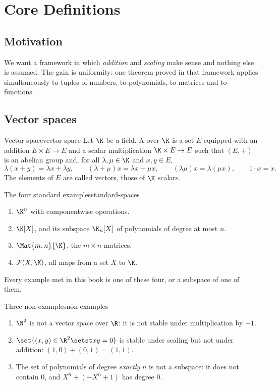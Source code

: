 \chapter{Core Definitions}
\label{ch:definitions}

\section{Motivation}

We want a framework in which \emph{addition} and \emph{scaling} make sense and
nothing else is assumed. The gain is uniformity: one theorem proved in that
framework applies simultaneously to tuples of numbers, to polynomials, to
matrices and to functions.

\section{Vector spaces}

\begin{definition}{Vector space}{vector-space}
Let $\K$ be a field. A  over $\K$ is a set $E$ equipped with
an addition $E\times E\to E$ and a scalar multiplication $\K\times E\to E$ such
that $(E,+)$ is an abelian group and, for all $\lambda,\mu\in\K$ and
$x,y\in E$,
\[
  \lambda(x+y)=\lambda x+\lambda y,\qquad
  (\lambda+\mu)x=\lambda x+\mu x,\qquad
  (\lambda\mu)x=\lambda(\mu x),\qquad
  1\cdot x=x.
\]
The elements of $E$ are called vectors, those of $\K$ scalars.
\end{definition}

\begin{example}{The four standard examples}{standard-spaces}
\begin{enumerate}
  \item $\K^{n}$ with componentwise operations.
  \item $\K[X]$, and its subspace $\K_{n}[X]$ of polynomials of degree at most $n$.
  \item $\Mat{m,n}{\K}$, the $m\times n$ matrices.
  \item $\mathcal{F}(X,\K)$, all maps from a set $X$ to $\K$.
\end{enumerate}
Every example met in this book is one of these four, or a subspace of one of them.
\end{example}

\begin{example}{Three non-examples}{non-examples}
\begin{enumerate}
  \item $\N^{2}$ is not a vector space over $\R$: it is not stable under
        multiplication by $-1$.
  \item $\set{(x,y)\in\R^{2}\setst xy=0}$ is stable under scaling but not under
        addition: $(1,0)+(0,1)=(1,1)$.
  \item The set of polynomials of degree \emph{exactly} $n$ is not a subspace:
        it does not contain $0$, and $X^{n}+(-X^{n}+1)$ has degree $0$.
\end{enumerate}
\end{example}

